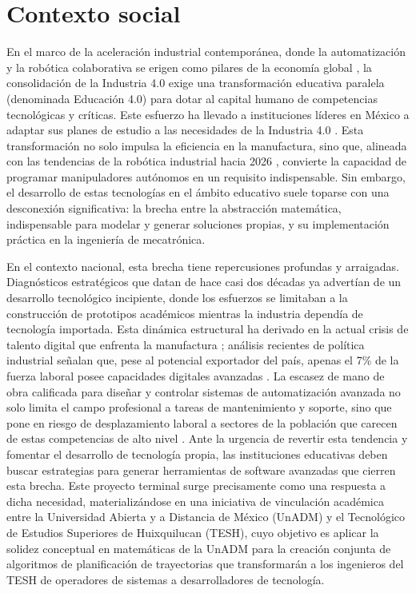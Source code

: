 \section{Contexto social}

En el marco de la aceleración industrial contemporánea, donde la automatización y la 
robótica colaborativa se erigen como pilares de la economía 
global \parencite{ElFinanciero_Renacimiento_2025}, la consolidación de la Industria 4.0 
exige una transformación educativa paralela (denominada Educación 4.0) para dotar al 
capital humano de competencias tecnológicas y críticas. Este esfuerzo 
ha llevado a instituciones líderes en México a adaptar 
sus planes de estudio a las necesidades de la 
Industria 4.0 \parencite{Avalos_IPN_2023, Zazueta_Educacion40_2023}. 
Esta transformación no solo impulsa la eficiencia en la manufactura, sino que, alineada con las tendencias 
de la robótica industrial hacia 2026 \parencite{MMS_Tendencias_2023}, convierte la capacidad 
de programar manipuladores autónomos en un requisito indispensable. Sin embargo, el 
desarrollo de estas tecnologías en el ámbito educativo suele toparse con una desconexión 
significativa: la brecha entre la abstracción matemática, 
indispensable para modelar y generar soluciones propias, 
y su implementación práctica en la ingeniería de mecatrónica.

En el contexto nacional, esta brecha tiene repercusiones profundas 
y arraigadas. Diagnósticos 
estratégicos que datan de hace casi dos décadas \parencite{SE_Mecatronica_2007} ya advertían de un 
desarrollo tecnológico incipiente, donde los esfuerzos se limitaban a la construcción 
de prototipos académicos mientras la industria dependía de tecnología importada. Esta 
dinámica estructural ha derivado en la actual crisis de talento digital que enfrenta la 
manufactura \parencite{Energy_Talento_2025}; análisis recientes de política industrial señalan que, 
pese al potencial exportador del país, apenas el 7\% de la fuerza laboral posee capacidades 
digitales avanzadas \parencite{Solleiro2023}. La escasez de mano de obra calificada para 
diseñar y controlar sistemas de automatización avanzada no solo limita el campo 
profesional a tareas de mantenimiento y soporte, sino que pone en riesgo de 
desplazamiento laboral a sectores de la población que carecen de estas competencias 
de alto nivel \parencite{Zazueta_Educacion40_2023}. Ante la urgencia de revertir esta 
tendencia y fomentar el desarrollo de tecnología propia, las instituciones educativas 
deben buscar estrategias para generar herramientas de software avanzadas que cierren 
esta brecha. Este proyecto terminal surge precisamente como una respuesta a dicha 
necesidad, materializándose en una iniciativa de vinculación académica entre 
la Universidad Abierta y a Distancia de México (UnADM) y 
el Tecnológico de Estudios Superiores de Huixquilucan (TESH),
cuyo objetivo es aplicar la solidez conceptual en matemáticas de la 
UnADM para la creación conjunta de algoritmos de planificación de 
trayectorias que transformarán a los ingenieros del TESH de 
operadores de sistemas a desarrolladores de tecnología.

